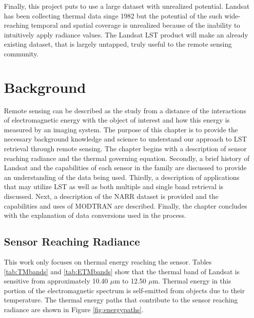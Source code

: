 \documentclass{book}
\begin{document}
Finally, this project puts to use a large dataset with unrealized potential.  Landsat has been collecting thermal data singe 1982 but the potential of the such wide-reaching temporal and spatial coverage is unrealized because of the inability to intuitively apply radiance values.  The Landsat LST product will make an already existing dataset, that is largely untapped, truly useful to the remote sensing community.

\chapter{Background}
\label{ch:background}

Remote sensing can be described as the study from a distance of the interactions of electromagnetic energy with the object of interest and how this energy is measured by an imaging system.  The purpose of this chapter is to provide the necessary background knowledge and science to understand our approach to LST retrieval through remote sensing.  The chapter begins with a description of sensor reaching radiance and the thermal governing equation.  Secondly, a brief history of Landsat and the capabilities of each sensor in the family are discussed to provide an understanding of the data being used.  Thirdly, a description of applications that may utilize LST as well as both multiple and single band retrieval is discussed.  Next, a description of the NARR dataset is provided and the capabilities and uses of MODTRAN are described.  Finally, the chapter concludes with the explanation of data conversions used in the process.

\section{Sensor Reaching Radiance}
\label{sec:remotesensing}

This work only focuses on thermal energy reaching the sensor.  Tables \ref{tab:TMbands} and \ref{tab:ETMbands} show that the thermal band of Landsat is sensitive from approximately 10.40 $\mu$m to 12.50 $\mu$m.  Thermal energy in this portion of the electromagnetic spectrum is self-emitted from objects due to their temperature.  The thermal energy paths that contribute to the sensor reaching radiance are shown in Figure \ref{fig:energypaths}.  
\end{document}
